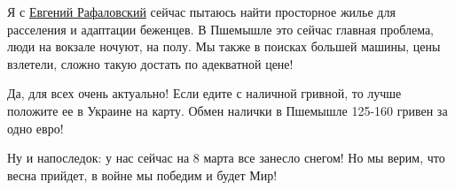 Я с \href{https://www.facebook.com/evgen.rafalovsky}{Евгений Рафаловский}
сейчас пытаюсь найти просторное жилье для расселения и адаптации беженцев. В
Пшемышле это сейчас главная проблема, люди на вокзале ночуют, на полу. Мы также
в поисках большей машины, цены взлетели, сложно такую достать по адекватной
цене!

Да, для всех очень актуально! Если едите с наличной гривной, то лучше положите
ее в Украине на карту. Обмен налички в Пшемышле 125-160 гривен за одно евро!

Ну и напоследок: у нас сейчас на 8 марта все занесло  снегом! Но мы верим, что
весна прийдет, в войне мы победим и будет Мир!

